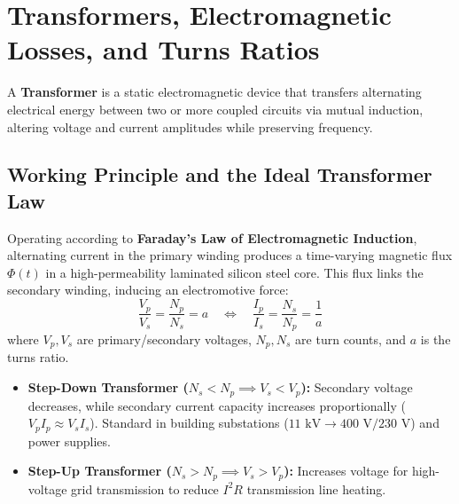 \section{Transformers, Electromagnetic Losses, and Turns Ratios}
\label{sec:transformers}

A \textbf{Transformer} is a static electromagnetic device that transfers alternating electrical energy between two or more coupled circuits via mutual induction, altering voltage and current amplitudes while preserving frequency.

\subsection{Working Principle and the Ideal Transformer Law}
Operating according to \textbf{Faraday's Law of Electromagnetic Induction}, alternating current in the primary winding produces a time-varying magnetic flux $\Phi(t)$ in a high-permeability laminated silicon steel core. This flux links the secondary winding, inducing an electromotive force:
\begin{equation}
\label{eq:transformer_ratio}
\boxed{\frac{V_p}{V_s} = \frac{N_p}{N_s} = a \quad \Longleftrightarrow \quad \frac{I_p}{I_s} = \frac{N_s}{N_p} = \frac{1}{a}}
\end{equation}
where $V_p, V_s$ are primary/secondary voltages, $N_p, N_s$ are turn counts, and $a$ is the turns ratio.
\begin{itemize}
    \item \textbf{Step-Down Transformer ($N_s < N_p \implies V_s < V_p$):} Secondary voltage decreases, while secondary current capacity increases proportionally ($V_p I_p \approx V_s I_s$). Standard in building substations ($11\text{ kV} \to 400\text{ V}/230\text{ V}$) and power supplies.
    \item \textbf{Step-Up Transformer ($N_s > N_p \implies V_s > V_p$):} Increases voltage for high-voltage grid transmission to reduce $I^2R$ transmission line heating.
\end{itemize}

